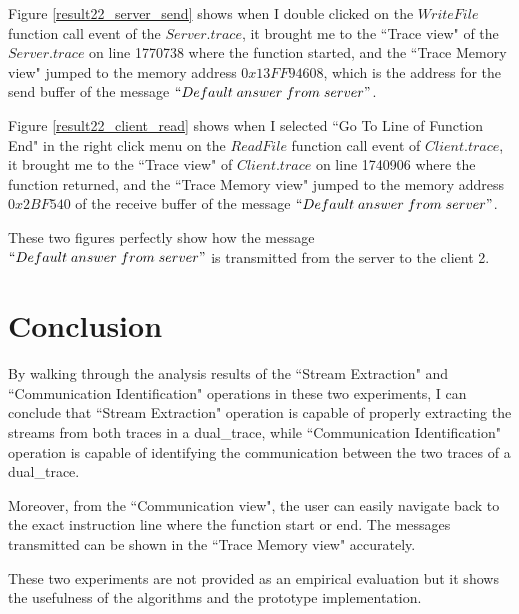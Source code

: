 Figure \ref{result22_server_send} shows when I double clicked on the $WriteFile$ function call event of the $Server.trace$, it brought me to the ``Trace view" of the $Server.trace$ on line 1770738 where the function started, and the ``Trace Memory view" jumped to the memory address $0x13FF94608$, which is the address for the send buffer of the message $``Default\; answer\; from\; server"$.

Figure \ref{result22_client_read} shows when I selected ``Go To Line of Function End" in the right click menu on the $ReadFile$ function call event of $Client.trace$, it brought me to the ``Trace view" of $Client.trace$ on line 1740906 where the function returned, and the ``Trace Memory view" jumped to the memory address $0x2BF540$ of the receive buffer of the message $``Default\; answer\; from\; server"$.

These two figures perfectly show how the message $``Default\; answer\; from\; server"$ is transmitted from the server to the client 2.

\section{Conclusion}
By walking through the analysis results of the ``Stream Extraction" and ``Communication Identification" operations in these two experiments, I can conclude that ``Stream Extraction" operation is capable of properly extracting the streams from both traces in a dual\_trace, while ``Communication Identification" operation is capable of identifying the communication between the two traces of a dual\_trace. 

Moreover, from the ``Communication view", the user can easily navigate back to the exact instruction line where the function start or end. The messages transmitted can be shown in the ``Trace Memory view" accurately.

These two experiments are not provided as an empirical evaluation but it shows the usefulness of the algorithms and the prototype implementation.







   




